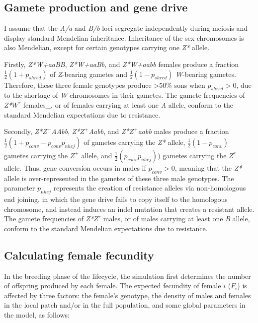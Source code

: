 \documentclass[]{rsos}%
\begin{document}
\hypertarget{gamete-production-and-gene-drive}{%
\subsection{Gamete production and gene
drive}\label{gamete-production-and-gene-drive}}

I assume that the \emph{A/a} and \emph{B/b} loci segregate independently
during meiosis and display standard Mendelian inheritance. Inheritance
of the sex chromosomes is also Mendelian, except for certain genotypes
carrying one \emph{Z*} allele.

Firstly, \emph{Z*W+aaBB}, \emph{Z*W+aaBb}, and \emph{Z*W+aabb} females
produce a fraction \(\frac{1}{2}(1 + p_{shred})\) of \emph{Z}-bearing
gametes and \(\frac{1}{2}(1 - p_{shred})\) \emph{W}-bearing gametes.
Therefore, these three female genotypes produce \textgreater{}50\% sons
when \(p_{shred} > 0\), due to the shortage of \emph{W} chromosomes in
their gametes. The gamete frequencies of \emph{Z*}\(W^r\) females\_, or
of females carrying at least one \emph{A} allele, conform to the
standard Mendelian expectations due to resistance.

Secondly, \emph{Z*}\(Z^+\)\emph{AAbb}, \emph{Z*}\(Z^+\)\emph{Aabb}, and
\emph{Z*}\(Z^+\)\emph{aabb} males produce a fraction
\(\frac{1}{2}(1 + p_{conv} - p_{conv} p_{nhej})\) of gametes carrying
the \emph{Z*} allele, \(\frac{1}{2}(1 - p_{conv})\) gametes carrying the
\(Z^+\) allele, and \(\frac{1}{2}(p_{conv} p_{nhej}))\) gametes carrying
the \(Z^r\) allele. Thus, gene conversion occurs in males if
\(p_{conv} > 0\), meaning that the \emph{Z*} allele is over-represented
in the gametes of these three male genotypes. The parameter \(p_{nhej}\)
represents the creation of resistance alleles via non-homologous end
joining, in which the gene drive fails to copy itself to the homologous
chromosome, and instead induces an indel mutation that creates a
resistant allele. The gamete frequencies of \emph{Z*}\(Z^r\) males, or
of males carrying at least one \emph{B} allele, conform to the standard
Mendelian expectations due to resistance.

\hypertarget{calculating-female-fecundity}{%
\subsection{Calculating female
fecundity}\label{calculating-female-fecundity}}

In the breeding phase of the lifecycle, the simulation first determines
the number of offspring produced by each female. The expected fecundity
of female \(i\) (\(F_i\)) is affected by three factors: the female's
genotype, the density of males and females in the local patch and/or in
the full population, and some global parameters in the model, as
follows:
\end{document}
